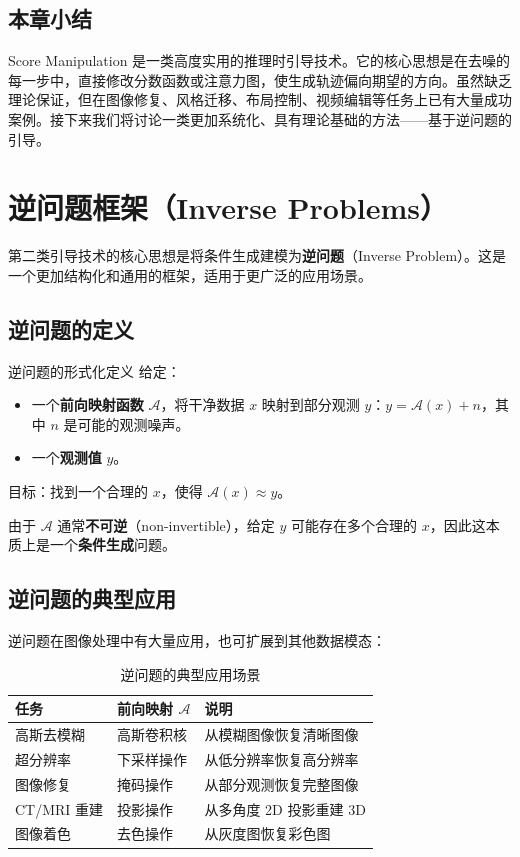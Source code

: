 \documentclass[a4paper]{article}
\begin{document}
\subsection{本章小结}

Score Manipulation 是一类高度实用的推理时引导技术。它的核心思想是在去噪的每一步中，直接修改分数函数或注意力图，使生成轨迹偏向期望的方向。虽然缺乏理论保证，但在图像修复、风格迁移、布局控制、视频编辑等任务上已有大量成功案例。接下来我们将讨论一类更加系统化、具有理论基础的方法——基于逆问题的引导。


\section{逆问题框架（Inverse Problems）}

第二类引导技术的核心思想是将条件生成建模为\textbf{逆问题}（Inverse Problem）。这是一个更加结构化和通用的框架，适用于更广泛的应用场景。

\subsection{逆问题的定义}

\begin{importantbox}{逆问题的形式化定义}
给定：
\begin{itemize}
    \item 一个\textbf{前向映射函数} $\mathcal{A}$，将干净数据 $x$ 映射到部分观测 $y$：$y = \mathcal{A}(x) + n$，其中 $n$ 是可能的观测噪声。
    \item 一个\textbf{观测值} $y$。
\end{itemize}
目标：找到一个合理的 $x$，使得 $\mathcal{A}(x) \approx y$。

由于 $\mathcal{A}$ 通常\textbf{不可逆}（non-invertible），给定 $y$ 可能存在多个合理的 $x$，因此这本质上是一个\textbf{条件生成}问题。
\end{importantbox}

\subsection{逆问题的典型应用}

逆问题在图像处理中有大量应用，也可扩展到其他数据模态：

\begin{table}[H]
\centering
\begin{tabular}{lll}
\toprule
\textbf{任务} & \textbf{前向映射 $\mathcal{A}$} & \textbf{说明} \\
\midrule
高斯去模糊 & 高斯卷积核 & 从模糊图像恢复清晰图像 \\
超分辨率 & 下采样操作 & 从低分辨率恢复高分辨率 \\
图像修复 & 掩码操作 & 从部分观测恢复完整图像 \\
CT/MRI 重建 & 投影操作 & 从多角度 2D 投影重建 3D \\
图像着色 & 去色操作 & 从灰度图恢复彩色图 \\
\bottomrule
\end{tabular}
\caption{逆问题的典型应用场景}
\end{table}
\end{document}
